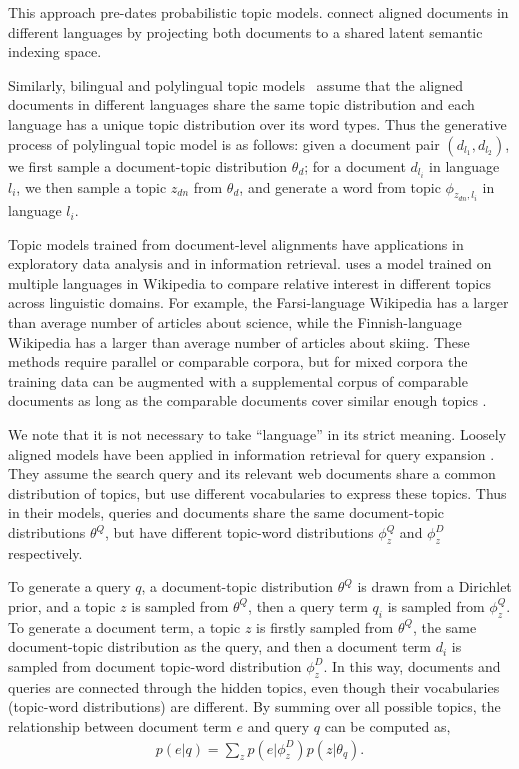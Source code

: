 This approach pre-dates probabilistic topic models.
\citet{Landauer-1990} connect aligned documents in different languages
by projecting both documents to a shared latent semantic indexing
space.

Similarly, bilingual \cite{zhao-06} and polylingual topic models~\citep[\plda{}]{mimno-09}
assume that the aligned documents in different languages share the
same topic distribution and each language has a unique topic
distribution over its word types.
Thus the generative process of polylingual topic model is as follows:
given a document pair $(d_{l_1}, d_{l_2})$, we first sample a
document-topic distribution $\theta_d$; for a document $d_{l_i}$ in
language $l_i$, we then sample a topic $z_{dn}$ from $\theta_d$, and
generate a word from topic $\phi_{z_{dn}, l_i}$ in language $l_i$.

Topic models trained from document-level alignments have applications in exploratory data analysis and in information retrieval.
\cite{mimno-09} uses a model trained on multiple languages in Wikipedia to compare relative interest in different topics across linguistic domains.
For example, the Farsi-language Wikipedia has a larger than average number of articles about science, while the Finnish-language Wikipedia has a larger than average number of articles about skiing.
These methods require parallel or comparable corpora, but for mixed corpora the training data can be augmented with a supplemental corpus of comparable documents as long as  the comparable documents cover similar enough topics \cite{mimno-12b}.
 
We note that it is not necessary to take ``language'' in its strict meaning.
Loosely aligned models have been applied in information retrieval for query expansion \citep{Gao-2011,Gao-2012}. They assume the search
query and its relevant web documents share a common distribution of
topics, but use different vocabularies to express these topics. Thus
in their models, queries and documents share the same document-topic
distributions $\theta^Q$, but have different topic-word distributions
$\phi_z^Q$ and $\phi_z^D$ respectively.

To generate a query $q$, a document-topic distribution $\theta^Q$ is
drawn from a Dirichlet prior, and a topic $z$ is sampled from
$\theta^Q$, then a query term $q_i$ is sampled from $\phi_z^Q$. To
generate a document term, a topic $z$ is firstly sampled from
$\theta^Q$, the same document-topic distribution as the query, and
then a document term $d_i$ is sampled from document topic-word
distribution $\phi_z^D$. In this way, documents and queries are
connected through the hidden topics, even though their vocabularies
(topic-word distributions) are different. By summing over all possible
topics, the relationship between document term $e$ and query $q$ can
be computed as,
\begin{align}
p(e|q) = \sum_z p(e|\phi_z^D) p(z | \theta_q).
\end{align}

